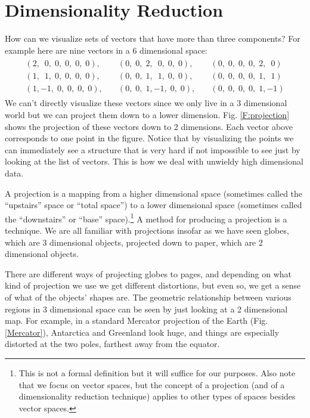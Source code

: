 \section{Dimensionality Reduction}
\label{S:dimred}


   How can we visualize sets of vectors that have more than three components?  For
example here are nine vectors in a 6 dimensional space:
\begin{eqnarray*}
\begin{array}{rrr}
  ( 2,\;~0,\; 0,\; 0,\; 0,\; 0), \quad 
& ( 0,\; 0,\; 2,\;~0,\; 0,\; 0), \quad 
& ( 0,\; 0,\; 0,\; 0,\; 2,\;~0)  \\
  ( 1,\;~1,\; 0,\; 0,\; 0,\; 0), \quad 
& ( 0,\; 0,\; 1,\;~1,\; 0,\; 0), \quad 
& ( 0,\; 0,\; 0,\; 0,\; 1,\;~1)  \\
  ( 1,  -1,\; 0,\; 0,\; 0,\; 0), \quad 
& ( 0,\; 0,\; 1,  -1,\; 0,\; 0), \quad 
& ( 0,\; 0,\; 0,\; 0,\; 1,  -1)
\end{array}
\end{eqnarray*}
We can't directly visualize these vectors since we only live in a 3 dimensional 
world but we can project them down to a lower dimension. Fig. 
\ref{F:projection} shows the projection of these vectors down to 2 dimensions.
Each vector above corresponds to one point in the figure. Notice that by 
visualizing the points we can immediately see a structure that is very hard if 
not impossible to see just by looking at the list of vectors. This is how we deal with unwieldy high dimensional data. 

A projection is a mapping from a higher dimensional space (sometimes called the ``upstairs'' space or ``total space'') to a lower dimensional space (sometimes called the ``downstairs'' or ``base'' space).\footnote{This is not a formal definition but it will suffice for our purposes. Also note that we focus on vector spaces, but the concept of a projection (and of a dimensionality reduction technique) applies to other types of spaces besides vector spaces.} A method for producing a projection is a  technique. We are all 
familiar with projections insofar as we have seen globes, which are 3 
dimensional objects, projected down to paper, which are 2 dimensional objects. 

    There are different ways of projecting globes to pages, and depending on 
what kind of projection we use we get different distortions, but even so, we 
get a sense of what of the objects' shapes are. The geometric relationship between 
various regions in 3 dimensional space can be seen by just looking at a 2 
dimensional map. For example, in a standard Mercator projection of the Earth 
(Fig. \ref{Mercator}), Antarctica and Greenland look huge, and things are 
especially distorted at the two poles, farthest away from the equator.

